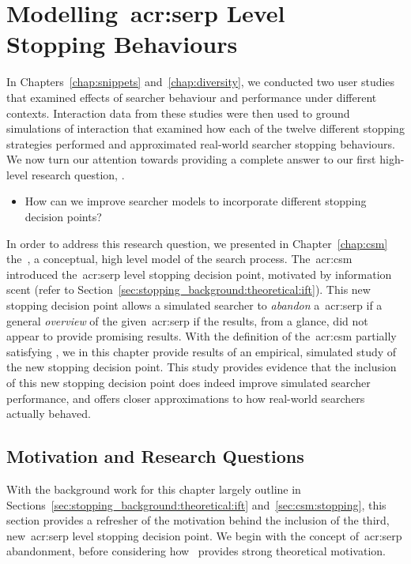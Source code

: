 
\chapter[Modelling SERP Level Stopping Behaviours]{Modelling~\gls{acr:serp} Level\\Stopping Behaviours}\label{chap:serp}
In Chapters~\ref{chap:snippets} and~\ref{chap:diversity}, we conducted two user studies that examined effects of searcher behaviour and performance under different contexts. Interaction data from these studies were then used to ground simulations of interaction that examined how each of the twelve different stopping strategies performed and approximated real-world searcher stopping behaviours. We now turn our attention towards providing a complete answer to our first high-level research question, .

\begin{itemize}
    \item[]{ How can we improve searcher models to incorporate different stopping decision points?}
\end{itemize}

In order to address this research question, we presented in Chapter~\ref{chap:csm} the~, a conceptual, high level model of the search process. The~\gls{acr:csm} introduced the~\gls{acr:serp} level stopping decision point, motivated by information scent (refer to Section~\ref{sec:stopping_background:theoretical:ift}). This new stopping decision point allows a simulated searcher to \emph{abandon} a~\gls{acr:serp} if a general \emph{overview} of the given~\gls{acr:serp} if the results, from a glance, did not appear to provide promising results. With the definition of the~\gls{acr:csm} partially satisfying , we in this chapter provide results of an empirical, simulated study of the new stopping decision point. This study provides evidence that the inclusion of this new stopping decision point does indeed improve simulated searcher performance, and offers closer approximations to how real-world searchers actually behaved.

\section{Motivation and Research Questions}\label{sec:serp:background}
With the background work for this chapter largely outline in Sections~\ref{sec:stopping_background:theoretical:ift} and~\ref{sec:csm:stopping}, this section provides a refresher of the motivation behind the inclusion of the third, new~\gls{acr:serp} level stopping decision point. We begin with the concept of~\gls{acr:serp} abandonment, before considering how~ provides strong theoretical motivation.

